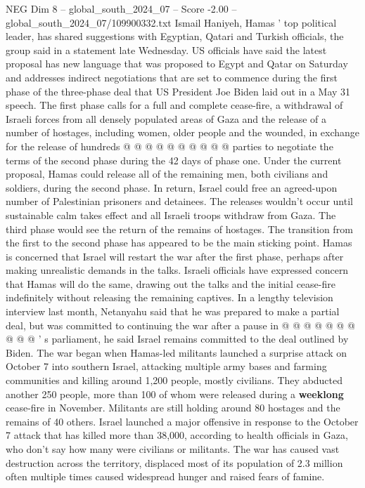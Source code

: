 \begin{textsample}{NEG Dim 8 – global\_south\_2024\_07 – Score -2.00 – global\_south\_2024\_07/109900332.txt}
Ismail Haniyeh, Hamas ' top political leader, has shared suggestions with Egyptian, Qatari and Turkish officials, the group said in a statement late Wednesday.
US officials have said the latest proposal has new language that was proposed to Egypt and Qatar on Saturday and addresses indirect negotiations that are set to commence during the first phase of the three-phase deal that US President Joe Biden laid out in a May 31 speech.
The first phase calls for a full and complete cease-fire, a withdrawal of Israeli forces from all densely populated areas of Gaza and the release of a number of hostages, including women, older people and the wounded, in exchange for the release of hundreds @ @ @ @ @ @ @ @ @ @ parties to negotiate the terms of the second phase during the 42 days of phase one.
Under the current proposal, Hamas could release all of the remaining men, both civilians and soldiers, during the second phase.
In return, Israel could free an agreed-upon number of Palestinian prisoners and detainees.
The releases wouldn't occur until sustainable calm takes effect and all Israeli troops withdraw from Gaza.
The third phase would see the return of the remains of hostages.
The transition from the first to the second phase has appeared to be the main sticking point.
Hamas is concerned that Israel will restart the war after the first phase, perhaps after making unrealistic demands in the talks.
Israeli officials have expressed concern that Hamas will do the same, drawing out the talks and the initial cease-fire indefinitely without releasing the remaining captives.
In a lengthy television interview last month, Netanyahu said that he was prepared to make a partial deal, but was committed to continuing the war after a pause in @ @ @ @ @ @ @ @ @ @ ' s parliament, he said Israel remains committed to the deal outlined by Biden.
The war began when Hamas-led militants launched a surprise attack on October 7 into southern Israel, attacking multiple army bases and farming communities and killing around 1,200 people, mostly civilians.
They abducted another 250 people, more than 100 of whom were released during a \textbf{weeklong} cease-fire in November.
Militants are still holding around 80 hostages and the remains of 40 others.
Israel launched a major offensive in response to the October 7 attack that has killed more than 38,000, according to health officials in Gaza, who don't say how many were civilians or militants.
The war has caused vast destruction across the territory, displaced most of its population of 2.3 million often multiple times caused widespread hunger and raised fears of famine.

\end{textsample}

